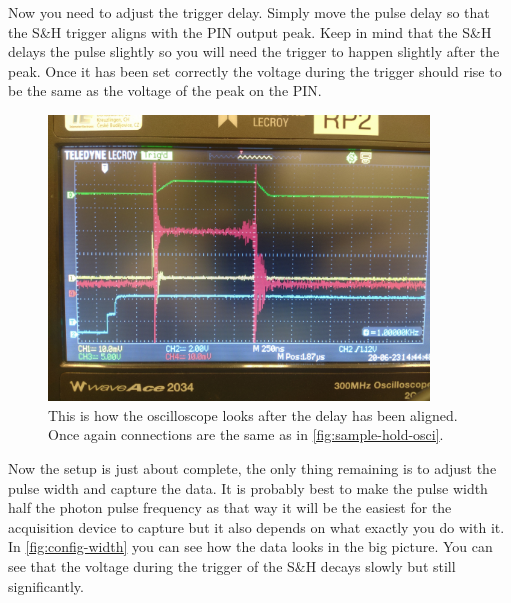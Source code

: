 \documentclass[a4paper, 10pt]{article}
\begin{document}
Now you need to adjust the trigger delay.
Simply move the pulse delay so that the S\&H trigger aligns with the PIN output peak.
Keep in mind that the S\&H delays the pulse slightly so you will need the trigger to happen slightly after the peak.
Once it has been set correctly the voltage during the trigger should rise to be the same as the voltage of the peak on the PIN.

\begin{figure}[H]
    \centering
    \includegraphics[width=0.9\textwidth]{../images/config-delay-aligned.jpg}
    \caption{This is how the oscilloscope looks after the delay has been aligned. Once again connections are the same as in \cref{fig:sample-hold-osci}.}
    \label{fig:config-delay-aligned}
\end{figure}

Now the setup is just about complete, the only thing remaining is to adjust the pulse width and capture the data.
It is probably best to make the pulse width half the photon pulse frequency as that way it will be the easiest for the acquisition device to capture but it also depends on what exactly you do with it.
In \cref{fig:config-width} you can see how the data looks in the big picture.
You can see that the voltage during the trigger of the S\&H decays slowly but still significantly.
\end{document}
